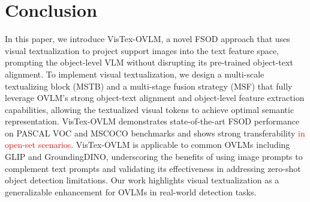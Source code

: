 \documentclass[10pt,twocolumn,letterpaper]{article}
\begin{document}

\section{Conclusion}
In this paper, we introduce VisTex-OVLM, a novel FSOD approach that uses visual textualization to project support images into the text feature space, prompting the object-level VLM without disrupting its pre-trained object-text alignment. To implement visual textualization, we design a multi-scale textualizing block (MSTB) and a multi-stage fusion strategy (MSF) that fully leverage OVLM's strong object-text alignment and object-level feature extraction capabilities, allowing the textualized visual tokens to achieve optimal semantic representation. VisTex-OVLM demonstrates state-of-the-art FSOD performance on PASCAL VOC and MSCOCO benchmarks and shows strong transferability \textcolor{red}{in open-set scenarios}. VisTex-OVLM is applicable to common OVLMs including GLIP and GroundingDINO, underscoring the benefits of using image prompts to complement text prompts and validating its effectiveness in addressing zero-shot object detection limitations. Our work highlights visual textualization as a generalizable enhancement for OVLMs in real-world detection tasks.

\clearpage

{
    \small
    
    
}



\end{document}

